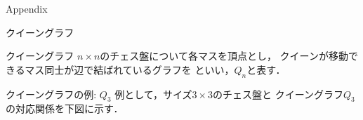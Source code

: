 \appendix
\backupbegin

\begin{frame}{}\Huge
 Appendix
\end{frame}

\begin{frame}{クイーングラフ}
 \begin{block}{クイーングラフ}
  $n\times n$のチェス盤について各マスを頂点とし，
  クイーンが移動できるマス同士が辺で結ばれているグラフを
  といい，$Q_n$と表す．
 \end{block}
 \begin{exampleblock}{クイーングラフの例: $Q_3$}
  例として，サイズ$3 \times 3$のチェス盤と
  クイーングラフ$Q_3$の対応関係を下図に示す．
  \begin{figure}[htb]
   \label{ex:queengraph_3}
   \begin{minipage}[b]{0.2\linewidth}
    \centering
    
   \end{minipage} 
   \begin{minipage}[b]{0.5\linewidth}
    \centering
    
   \end{minipage}
  \end{figure}
 \end{exampleblock}
\end{frame}

